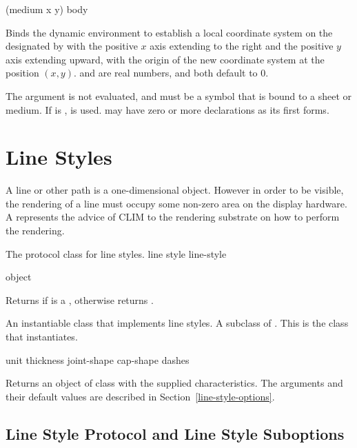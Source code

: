  {(medium \optional x y) \body body}

Binds the dynamic environment to establish a local coordinate system on the
 designated by  with the positive $x$ axis extending to
the right and the positive $y$ axis extending upward, with the origin of the new
coordinate system at the position $(x,y)$.   and  are real
numbers, and both default to 0.

The  argument is not evaluated, and must be a symbol that is bound
to a sheet or medium.  If  is ,  is
used.   may have zero or more declarations as its first forms.


\section {Line Styles\label{line-styles}}

A line or other path is a one-dimensional object.  However in order to be
visible, the rendering of a line must occupy some non-zero area on the display
hardware.  A  represents the advice of CLIM to the rendering
substrate on how to perform the rendering.


The protocol class for line styles.
 {line style} {line-style}

 {object}

Returns  if  is a , otherwise returns
.


An instantiable class that implements line styles.  A subclass of
.  This is the class that  instantiates.
\Immutable

 {\key unit thickness joint-shape cap-shape dashes}

Returns an object of class  with the supplied
characteristics.  The arguments and their default values are described in
Section~\ref{line-style-options}.


\subsection {Line Style Protocol and Line Style Suboptions\label{line-style-options}}

